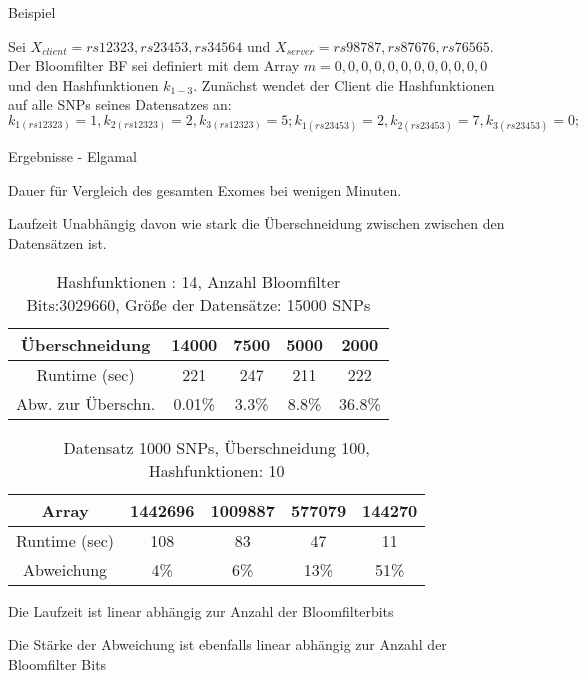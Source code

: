 \documentclass{beamer}
\begin{document}
\begin{frame}{Beispiel}
	
	Sei $ X_{client} = {rs12323, rs23453, rs34564} $ und $ X_{server} = {rs98787, rs87676, rs76565}  $. Der Bloomfilter BF sei definiert mit dem Array $ m = {0,0,0,0,0,0,0,0,0,0,0,0}  $ und den Hashfunktionen $ k_{1-3} $.
	Zunächst wendet der Client die Hashfunktionen auf alle SNPs seines Datensatzes an: $ k_{1 (rs12323)} =1 ,k_{2 (rs12323)} = 2 , k_{3 (rs12323)} = 5; k_{1 (rs23453)} =2 ,k_{2 (rs23453)} = 7 , k_{3 (rs23453)} = 0; $
	
	 
\end{frame}

\begin{frame}{Ergebnisse - Elgamal }
	
	\begin{arrowlist}
		\item Dauer für Vergleich des gesamten Exomes bei wenigen Minuten.
		\item Laufzeit Unabhängig davon wie stark die Überschneidung zwischen zwischen den Datensätzen ist. 
	\end{arrowlist}

 \begin{table}[h]
	\begin{tabular}{c|c|c|c|c}
		Überschneidung&14000&7500&5000&2000\\
		\hline
		Runtime (sec)& 221&247&211&222\\
		Abw. zur Überschn.& 0.01\%& 3.3\%&8.8\%&36.8\%\\
			 		
	\end{tabular}
	\caption{Hashfunktionen : 14, Anzahl Bloomfilter Bits:3029660, Größe der Datensätze: 15000 SNPs }
	\label{tab:meinetabelle1}
	
	
\end{table}


\end{frame}	
\begin{frame}
\begin{table}[h]
			 	
	\begin{tabular}{c|c|c|c|c}
	    Array& 1442696&1009887&577079&144270\\
	    \hline
		Runtime (sec)& 108&83&47&11\\
		Abweichung&4\%&6\%&13\%&51\%\\

			 		
	\end{tabular}
	\caption{Datensatz 1000 SNPs, Überschneidung 100, Hashfunktionen: 10 }
	\label{tab:meinetabelle2}
\end{table}

\begin{arrowlist}
	\item Die Laufzeit ist linear abhängig zur Anzahl der Bloomfilterbits
	\item Die Stärke der Abweichung ist ebenfalls linear abhängig zur Anzahl der Bloomfilter Bits
\end{arrowlist}
\end{frame}			 
	
\end{document}
